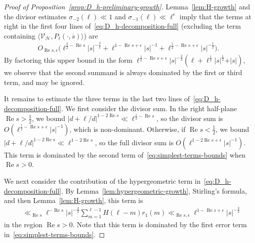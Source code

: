 \documentclass[11pt,reqno]{amsart}
\theoremstyle{plain}
\theoremstyle{definition}
\numberwithin{equation}{section}
\renewcommand{\Re}{\operatorname{Re}}
\begin{document}
\begin{proof}[Proof of Proposition~\ref{prop:D_h-preliminary-growth}]
Lemma~\ref{lem:H-growth} and the divisor estimates $\sigma_{-2}(\ell) \ll 1$ and $\sigma_{-1}(\ell) \ll \ell^\epsilon$ imply that the terms at right in the first four lines of~\eqref{eq:D_h-decomposition-full} (excluding the term containing $\langle \mathcal{V}_\mathcal{H}, P_\ell(\cdot, \overline{s}) \rangle$) are
\begin{align} \label{eq:simplest-terms-bounds}
	O_{\Re s, \epsilon}
		\big( \ell^{\frac{3}{2}-\Re s} \vert s \vert^{-\frac{3}{2}}
		+ \ell^{1-\Re s + \epsilon} \vert s \vert^{-1}
		+ \ell^{\frac{1}{2} - \Re s + \epsilon} \vert s \vert^{-\frac{1}{2}}
		\big).
\end{align}
By factoring this upper bound in the form $\ell^{\frac{1}{2} - \Re s + \epsilon} \vert s \vert^{-\frac{3}{2}}( \ell + \ell^{\frac{1}{2}} \vert s \vert^{\frac{1}{2}} + \vert s \vert)$, we observe that the second summand is always dominated by the first or third term, and may be ignored.

It remains to estimate the three terms in the last two lines of~\eqref{eq:D_h-decomposition-full}. 
We first consider the divisor sum. In the right half-plane $\Re s > \frac{1}{2}$, we bound $\vert d + \ell /d \vert^{1-2\Re s} \ll \ell^{\frac{1}{2}-\Re s}$, so the divisor sum is $O( \ell^{\frac{1}{2} - \Re s + \epsilon} \vert s \vert^{-1})$, which is non-dominant. Otherwise, if $\Re s < \frac{1}{2}$, we bound $\vert d + \ell/d \vert^{1-2\Re s} \ll \ell^{1-2\Re s}$, so the full divisor sum is $O(\ell^{1-2\Re s + \epsilon} \vert s \vert^{-1})$. This term is dominated by the second term of~\eqref{eq:simplest-terms-bounds} when $\Re s > 0$.

We next consider the contribution of the hypergeometric term in~\eqref{eq:D_h-decomposition-full}. By Lemma~\ref{lem:hypergeometric-growth}, Stirling's formula, and then Lemma~\ref{lem:H-growth}, this term is
\begin{align*}
	&\ll_{\Re s} \ell^{-\Re s} \vert s \vert^{-\frac{3}{2}} \sum_{m=1}^{\ell-1} H(\ell-m) r_1(m)
	\ll_{\Re s,\epsilon} \ell^{1- \Re s + \epsilon} \vert s \vert^{-\frac{3}{2}}
\end{align*}
in the region $\Re s > 0$. Note that this term is dominated by the first error term in~\eqref{eq:simplest-terms-bounds}. 


\end{proof}
\end{document}

